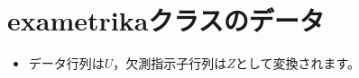 \documentclass[
  a4paper,
]{ltjsbook}
\newenvironment{Shaded}{\begin{snugshade}}{\end{snugshade}}
\newcommand{\FunctionTok}[1]{\textcolor[rgb]{0.28,0.35,0.67}{#1}}
\newcommand{\NormalTok}[1]{\textcolor[rgb]{0.00,0.23,0.31}{#1}}
\newcommand{\SpecialCharTok}[1]{\textcolor[rgb]{0.37,0.37,0.37}{#1}}
\providecommand{\tightlist}{%
  \setlength{\itemsep}{0pt}\setlength{\parskip}{0pt}}\usepackage{longtable,booktabs,array}
\begin{document}
\section{exametrikaクラスのデータ}\label{exametrikaux30afux30e9ux30b9ux306eux30c7ux30fcux30bf}

\begin{itemize}
\tightlist
\item
  データ行列は\(U\)，欠測指示子行列は\(Z\)として変換されます。
\end{itemize}

\begin{Shaded}
\end{Shaded}
\end{document}

